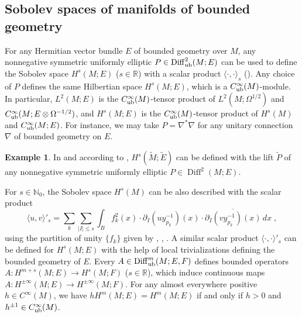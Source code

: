 \documentclass{memo-l}
\theoremstyle{plain}
\theoremstyle{definition}
\newtheorem{ex}[thm]{Example}
\theoremstyle{remark}
\newcommand{\N}{\mathbb{N}}
\newcommand{\R}{\mathbb{R}}
\newcommand{\Diff}{\operatorname{Diff}}
\newcommand{\Diffub}{\Diff_{\text{\rm ub}}}
\newcommand{\Cinftyub}{C^\infty_{\text{\rm ub}}}
\numberwithin{section}{chapter}
\numberwithin{equation}{section}%
\begin{document}



\subsection{Sobolev spaces of manifolds of bounded geometry}\label{ss: Sobolev bd geom}

For any Hermitian vector bundle $E$ of bounded geometry over $M$, any nonnegative symmetric uniformly elliptic $P\in\Diff^2_{\text{\rm ub}}(M;E)$ can be used to define the Sobolev space $H^s(M;E)$ ($s\in\R$) with a scalar product $\langle {\cdot},{\cdot}\rangle_s$ (). Any choice of $P$ defines the same Hilbertian space $H^s(M;E)$, which is a $\Cinftyub(M)$-module. In particular, $L^2(M;E)$ is the $\Cinftyub(M)$-tensor product of $L^2(M;\Omega^{1/2})$ and $\Cinftyub(M;E\otimes\Omega^{-1/2})$, and $H^s(M;E)$ is the $\Cinftyub(M)$-tensor product of $H^s(M)$ and $\Cinftyub(M;E)$. For instance, we may take $P=\nabla^*\nabla$ for any unitary connection $\nabla$ of bounded geometry on $E$. 

\begin{ex}\label{ex: widetilde P}
In  and according to , $H^s(\widetilde M;\widetilde E)$ can be defined with the lift $\widetilde P$ of any nonnegative symmetric uniformly elliptic $P\in\Diff^2(M;E)$.
\end{ex}

For $s\in\N_0$, the Sobolev space $H^s(M)$ can be also described with the scalar product
\[
\langle u,v\rangle'_s=\sum_k\sum_{|I|\le s}\int_Bf_k^2(x)\cdot\partial_I(uy_{p_k}^{-1})(x)\cdot\overline{\partial_I(vy_{p_k}^{-1})(x)}\,dx\;,
\]
using the partition of unity $\{f_k\}$ given by  \cite[Theorem~A.22]{Schick1996}, \cite[Propositions~3.2 and~3.3]{Schick2001}, \cite[Appendices~A1.2 and~A1.3]{Shubin1992}. A similar scalar product $\langle{\cdot},{\cdot}\rangle'_s$ can be defined for $H^s(M;E)$ with the help of local trivializations defining the bounded geometry of $E$. Every $A\in\Diffub^m(M;E,F)$ defines bounded operators $A:H^{m+s}(M;E)\to H^s(M;F)$ ($s\in\R$), which induce continuous maps $A:H^{\pm\infty}(M;E)\to H^{\pm\infty}(M;F)$. For any almost everywhere positive $h\in C^\infty(M)$, we have $hH^m(M;E)=H^m(M;E)$ if and only if $h>0$ and $h^{\pm1}\in\Cinftyub(M)$.
\end{document}
